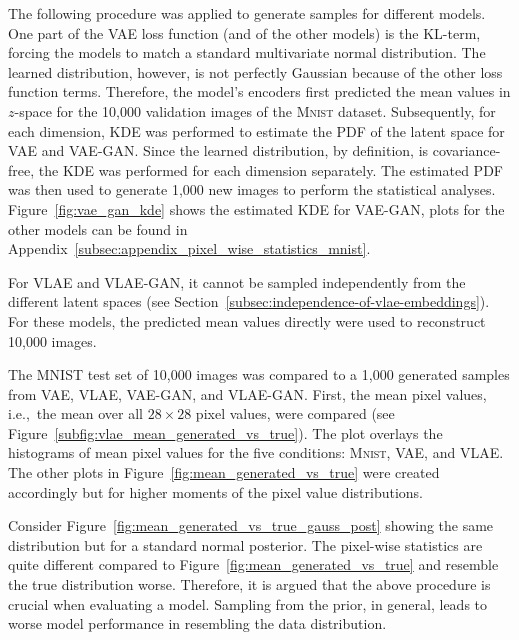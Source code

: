 The following procedure was applied to generate samples for different models.
One part of the \ac{VAE} loss function (and of the other models) is the \ac{KL}-term, forcing the models to match a standard multivariate normal distribution.
The learned distribution, however, is not perfectly Gaussian because of the other loss function terms.
Therefore, the model's encoders first predicted the mean values in $z$-space for the 10,000 validation images of the \textsc{Mnist} dataset.
Subsequently, for each dimension, \ac{KDE} was performed to estimate the \ac{PDF} of the latent space for \ac{VAE} and \ac{VAE}-\ac{GAN}.
Since the learned distribution, by definition, is covariance-free, the \ac{KDE} was performed for each dimension separately.
The estimated \ac{PDF} was then used to generate 1,000 new images to perform the statistical analyses.
Figure~\ref{fig:vae_gan_kde} shows the estimated \ac{KDE} for \ac{VAE}-\ac{GAN}, plots for the other models can be found in Appendix~\ref{subsec:appendix_pixel_wise_statistics_mnist}.

For \ac{VLAE} and \ac{VLAE}-\ac{GAN}, it cannot be sampled independently from the different latent spaces (see Section~\ref{subsec:independence-of-vlae-embeddings}).
For these models, the predicted mean values directly were used to reconstruct 10,000 images.

The MNIST test set of 10,000 images was compared to a 1,000 generated samples from \ac{VAE}, \ac{VLAE}, \ac{VAE}-\ac{GAN}, and \ac{VLAE}-\ac{GAN}.
First, the mean pixel values, i.e.,~the mean over all $28\times 28$ pixel values, were compared (see Figure~\ref{subfig:vlae_mean_generated_vs_true}).
The plot overlays the histograms of mean pixel values for the five conditions: \textsc{Mnist}, \ac{VAE}, and \ac{VLAE}.
The other plots in Figure~\ref{fig:mean_generated_vs_true} were created accordingly but for higher moments of the pixel value distributions.

Consider Figure~\ref{fig:mean_generated_vs_true_gauss_post} showing the same distribution but for a standard normal posterior.
The pixel-wise statistics are quite different compared to Figure~\ref{fig:mean_generated_vs_true} and resemble the true distribution worse.
Therefore, it is argued that the above procedure is crucial when evaluating a model.
Sampling from the prior, in general, leads to worse model performance in resembling the data distribution.


